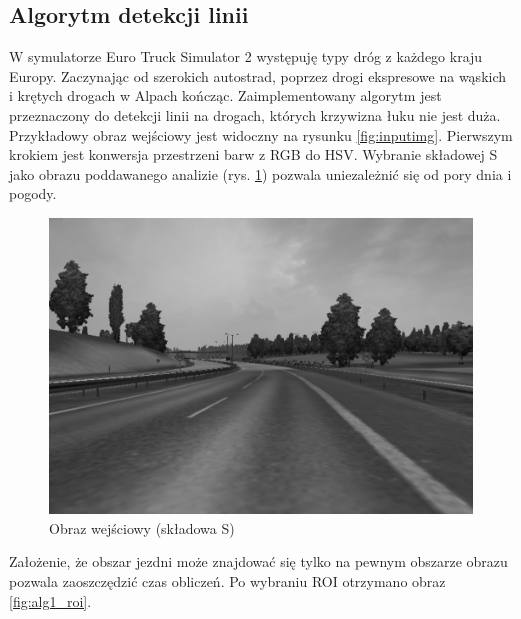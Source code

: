 \subsection{Algorytm detekcji linii}

W symulatorze Euro Truck Simulator 2 występuję typy dróg z każdego kraju Europy. 
Zaczynając od szerokich autostrad, poprzez drogi ekspresowe na wąskich i krętych drogach w Alpach kończąc. Zaimplementowany algorytm jest przeznaczony do detekcji linii na drogach, których krzywizna łuku nie jest duża. 
Przykładowy obraz wejściowy jest widoczny na rysunku \ref{fig:inputimg}. %
Pierwszym krokiem jest konwersja przestrzeni barw z RGB do HSV. 
Wybranie składowej S jako obrazu poddawanego analizie (rys. \ref{fig:alg1_S}) pozwala uniezależnić się od pory dnia i pogody.

\begin{figure}
  \centering
  \includegraphics[width=13cm]{img/alg1_gray.jpg}
  \caption{Obraz wejściowy (składowa S)}
  \label{fig:alg1_S}
\end{figure}

Założenie, że obszar jezdni może znajdować się tylko na pewnym obszarze obrazu pozwala zaoszczędzić czas obliczeń. %
Po wybraniu ROI otrzymano obraz \ref{fig:alg1_roi}.


